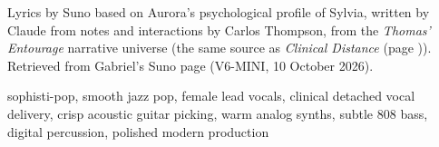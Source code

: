 
\begin{notes}
Lyrics by Suno based on Aurora's psychological profile of Sylvia, written by Claude from notes and interactions by Carlos Thompson, from the \emph{Thomas' Entourage} narrative universe (the same source as \emph{Clinical Distance} (page \pageref{sec:clinical-distance})). Retrieved from Gabriel's Suno page (V6-MINI, 10 October 2026).
\end{notes}
\begin{style}
sophisti-pop, smooth jazz pop, female lead vocals, clinical detached vocal delivery, crisp acoustic guitar picking, warm analog synths, subtle 808 bass, digital percussion, polished modern production
\end{style}

